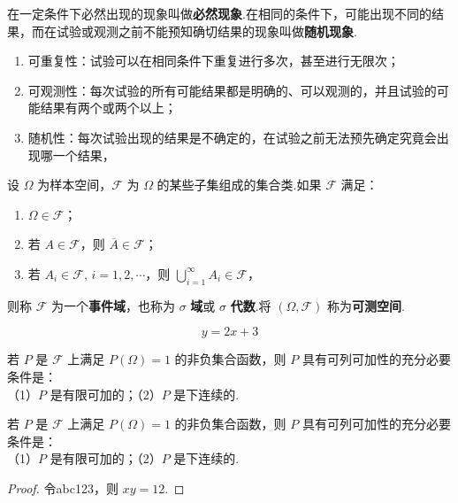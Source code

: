 \documentclass[zihao=-4, fontset=windows]{MyBeautybook-CN}
\begin{document}
    在一定条件下必然出现的现象叫做\textbf{必然现象}.在相同的条件下，可能出现不同的结果，而在试验或观测之前不能预知确切结果的现象叫做\textbf{随机现象}.

    \begin{enumerate}
        \item 可重复性：试验可以在相同条件下重复进行多次，甚至进行无限次；
        \item 可观测性：每次试验的所有可能结果都是明确的、可以观测的，并且试验的可能结果有两个或两个以上；
        \item 随机性：每次试验出现的结果是不确定的，在试验之前无法预先确定究竟会出现哪一个结果，
    \end{enumerate}

    \begin{definition}
        设 $\varOmega$ 为样本空间，$\mathcal{F}$ 为 $\varOmega$ 的某些子集组成的集合类.如果 $\mathcal{F}$ 满足：
        \begin{enumerate}
            \item $\varOmega \in \mathcal{F}$；
            \item 若 $A \in \mathcal{F}$，则 $\overline{A} \in \mathcal{F}$；
            \item 若 $A_i \in \mathcal{F}, \, i=1,2,\cdots$，则 $\displaystyle\bigcup_{i=1}^\infty A_i \in \mathcal{F}$，
        \end{enumerate}
        则称 $\mathcal{F}$ 为一个\textbf{事件域}，也称为 $\sigma$ \textbf{域}或 $\sigma$ \textbf{代数}.将 $(\varOmega, \mathcal{F})$ 称为\textbf{可测空间}.
    \end{definition}

    $$
    y=2x+3
    $$

    \begin{theorem}
        若 $P$ 是 $\mathcal{F}$ 上满足 $P(\varOmega) = 1$ 的非负集合函数，则 $P$ 具有可列可加性的充分必要条件是：\\
        （1）$P$ 是有限可加的；（2）$P$ 是下连续的.
    \end{theorem}

    \begin{lemma}
        若 $P$ 是 $\mathcal{F}$ 上满足 $P(\varOmega) = 1$ 的非负集合函数，则 $P$ 具有可列可加性的充分必要条件是：\\
        （1）$P$ 是有限可加的；（2）$P$ 是下连续的.
    \end{lemma}

    \begin{proof}
        令abc123，则 $xy=12$.
    \end{proof}
\end{document}
